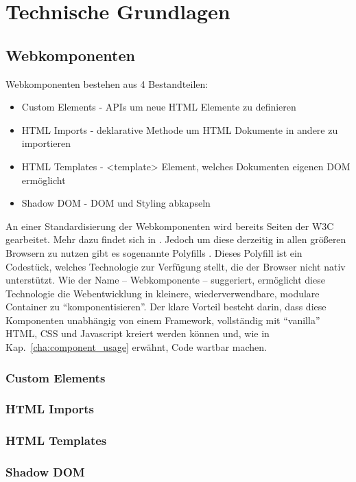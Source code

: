\chapter{Technische Grundlagen}

\section{Webkomponenten}
Webkomponenten bestehen aus 4 Bestandteilen:
\begin{itemize}
	\item Custom Elements - APIs um neue HTML Elemente zu definieren
	\item HTML Imports - deklarative Methode um HTML Dokumente in andere zu importieren
	\item HTML Templates - <template> Element, welches Dokumenten eigenen DOM ermöglicht
	\item Shadow DOM - DOM und Styling abkapseln
\end{itemize}
An einer Standardisierung der Webkomponenten wird bereits Seiten der W3C gearbeitet. Mehr dazu findet sich in \cite{w3c-components}. Jedoch um diese derzeitig in allen größeren Browsern zu nutzen gibt es sogenannte Polyfills \cite{polyfill}. Dieses Polyfill ist ein Codestück, welches Technologie zur Verfügung stellt, die der Browser nicht nativ unterstützt.
Wie der Name -- Webkomponente -- suggeriert, ermöglicht diese Technologie die Webentwicklung in kleinere, wiederverwendbare, modulare Container zu "`komponentisieren"'.  Der klare Vorteil besteht darin, dass diese Komponenten unabhängig von einem Framework, vollständig mit "`vanilla"' HTML, CSS und Javascript kreiert werden können und, wie in Kap.~\ref{cha:component_usage} erwähnt, Code wartbar machen.

\subsection{Custom Elements}
\subsection{HTML Imports}
\subsection{HTML Templates}
\subsection{Shadow DOM}

